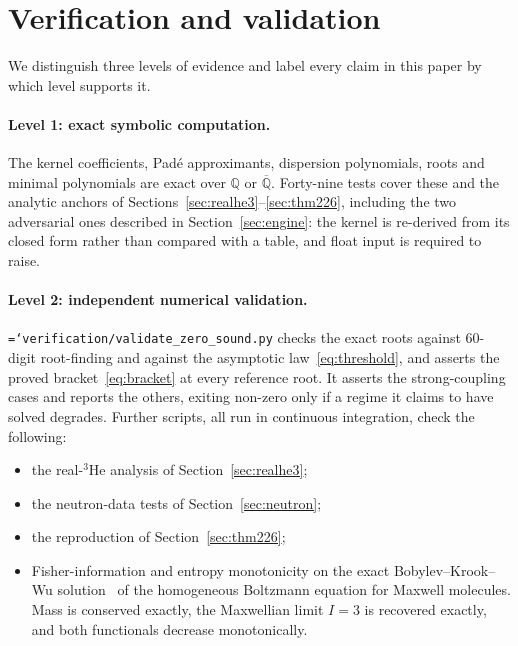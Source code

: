 \documentclass[11pt,a4paper]{article}
\newcommand{\code}[1]{\texttt{\hyphenchar\font=`\-\relax #1}}
\begin{document}
\section{Verification and validation}
\label{sec:vv}

We distinguish three levels of evidence and label every claim in this paper by
which level supports it.

\paragraph{Level 1: exact symbolic computation.} The kernel coefficients,
Pad\'e approximants, dispersion polynomials, roots and minimal polynomials are
exact over $\mathbb{Q}$ or $\overline{\mathbb{Q}}$. Forty-nine tests cover these and the
analytic anchors of Sections~\ref{sec:realhe3}--\ref{sec:thm226},
including the two adversarial ones described in Section~\ref{sec:engine}: the
kernel is re-derived from its closed form rather than compared with a table, and
float input is required to raise.

\paragraph{Level 2: independent numerical validation.}
\code{verification/validate\_zero\_sound.py} checks the exact roots against
$60$-digit root-finding and against the asymptotic
law~\eqref{eq:threshold}, and asserts the proved bracket~\eqref{eq:bracket} at every
reference root. It asserts the strong-coupling cases and reports the others, exiting non-zero
only if a regime it claims to have solved degrades. Further scripts, all run in continuous
integration, check the following:
\begin{itemize}
  \item the real-$^3$He analysis of Section~\ref{sec:realhe3};
  \item the neutron-data tests of Section~\ref{sec:neutron};
  \item the reproduction of Section~\ref{sec:thm226};
  \item Fisher-information and entropy monotonicity on the exact Bobylev--Krook--Wu
        solution~\cite{krookwu1976} of the homogeneous Boltzmann equation for Maxwell
        molecules. Mass is conserved exactly, the Maxwellian limit $I=3$ is recovered exactly,
        and both functionals decrease monotonically.
\end{itemize}
\end{document}
